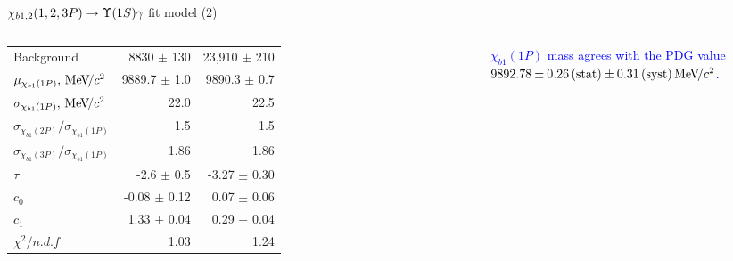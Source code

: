 \begin{frame}{$\chi_{b1,2}(1,2,3P) \to \OneS \gamma$ fit model (2)}
\begin{columns}[T]
{\begin{tabular}{lrr}
\rule{0pt}{4ex}Background & 8830 $\pm$ 130 & 23,910 $\pm$ 210\\

\rule{0pt}{4ex}$\mu_{\chi_{b 1}(1P)}, {\mathrm{\,Me\kern -0.1em V\!/}c^2}$ & 9889.7 $\pm$ 1.0 & 9890.3 $\pm$ 0.7\\
$\sigma_{\chi_{b 1}(1P)}, {\mathrm{\,Me\kern -0.1em V\!/}c^2}$ & 22.0 & 22.5\\
$\sigma_{\chi_{b1}(2P)} / \sigma_{\chi_{b1}(1P)}$ & 1.5 & 1.5\\
$\sigma_{\chi_{b1}(3P)} / \sigma_{\chi_{b1}(1P)}$ & 1.86 & 1.86\\

\rule{0pt}{4ex}$\tau$ & -2.6 $\pm$ 0.5 & -3.27 $\pm$ 0.30\\
$c_0$ & -0.08 $\pm$ 0.12 & 0.07 $\pm$ 0.06\\
$c_1$ & 1.33 $\pm$ 0.04 & 0.29 $\pm$ 0.04\\

\rule{0pt}{4ex}$\chi^2 / n.d.f$ & 1.03 & 1.24\\
\bottomrule
\end{tabular}
} %

\bigskip

{\tiny \textcolor{blue}{ $\chi_{b1}(1P)$ mass agrees with the PDG value
$9892.78 \pm 0.26\mathrm{\,(stat)} \pm0.31\mathrm{\,(syst)} {\mathrm{\,Me\kern -0.1em V\!/}c^2}$.}}
\end{columns}


\end{frame}
